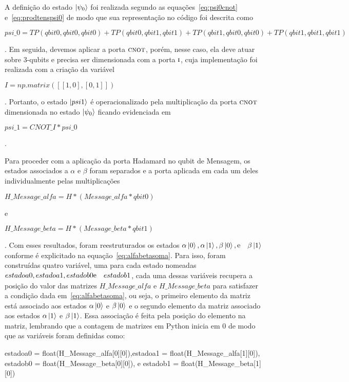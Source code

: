 A definição do estado $\ket{\psi_0}$ foi realizada segundo as equações~\eqref{eq:psi0cnot} e~\eqref{eq:prodtenspsi0} de modo que sua representação no código foi descrita como \begin{tiny}\textbf{$psi\_0 = TP(qbit0, qbit0, qbit0) + TP(qbit0, qbit1, qbit1) + TP(qbit1,qbit0, qbit0) + TP(qbit1,qbit1,qbit1)$}\end{tiny}. Em seguida, devemos aplicar a porta \(\operatorname{\textsc{cnot}}\), porém, nesse caso, ela deve atuar sobre 3-qubits e precisa ser dimensionada com a porta \(\operatorname{\textsc{i}}\), cuja implementação foi realizada com a criação da variável \begin{tiny}\textbf{$I = np.matrix ([[1,0], [0,1]])$}\end{tiny}. Portanto, o estado $\ket{psi1}$ é operacionalizado pela multiplicação da porta \(\operatorname{\textsc{cnot}}\) dimensionada no estado $\ket{\psi_0}$ ficando evidenciada em \begin{tiny}\textbf{$psi\_1 = CNOT\_I * psi\_0$}\end{tiny}.

Para proceder com a aplicação da porta Hadamard no qubit de Mensagem, os estados associados a $\alpha$ e $\beta$ foram separados e a porta aplicada em cada um deles individualmente pelas multiplicações \begin{tiny}\textbf{$H\_Message\_alfa = H * (Message\_alfa * qbit0)$}\end{tiny} e \begin{tiny}\textbf{$H\_Message\_beta = H * (Message\_beta * qbit1)$}\end{tiny}. Com esses resultados, foram reestruturados os estados $\alpha\ket{0}, \alpha\ket{1}, \beta\ket{0}, \text e \quad \beta\ket{1}$ conforme é explicitado na equação~\eqref{eq:alfabetasoma}. Para isso, foram construídas quatro variável, uma para cada estado nomeadas \textit{$estadoa0, estadoa1, estadob0 \text e \quad estadob1$}, cada uma dessas variáveis recupera a posição do valor das matrizes \textit{$H\_Message\_alfa$} e \textit{$H\_Message\_beta$} para satisfazer a condição dada em~\eqref{eq:alfabetasoma}, ou seja, o primeiro elemento da matriz está associado aos estados $\alpha\ket{0}$ e $\beta\ket{0}$ e o segundo elemento da matriz associado aos estados $\alpha\ket{1}$ e $\beta\ket{1}$. Essa associação é feita pela posição do elemento na matriz, lembrando que a contagem de matrizes em Python inicia em 0 de modo que as variáveis foram definidas como:

\begin{center}
\begin{tiny}estadoa0 = float(H\_Message\_alfa[0][0]),estadoa1 = float(H\_Message\_alfa[1][0]),\linebreak
estadob0 = float(H\_Message\_beta[0][0]), \text e \quad estadob1 = float(H\_Message\_beta[1][0])\end{tiny}
\end{center}

